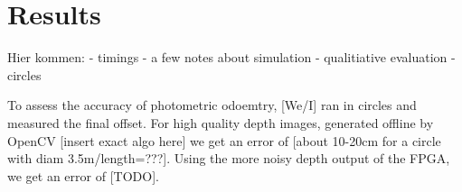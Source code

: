 \chapter{Results}
\label{sec:results}

Hier kommen:
- timings
- a few notes about simulation
- qualitiative evaluation
    - circles

    To assess the accuracy of photometric odoemtry, [We/I] ran in circles and measured the final offset. For high quality depth images, generated offline by OpenCV [insert exact algo here] we get an error of [about 10-20cm for a circle with diam 3.5m/length=???]. Using the more noisy depth output of the FPGA, we get an error of [TODO].
